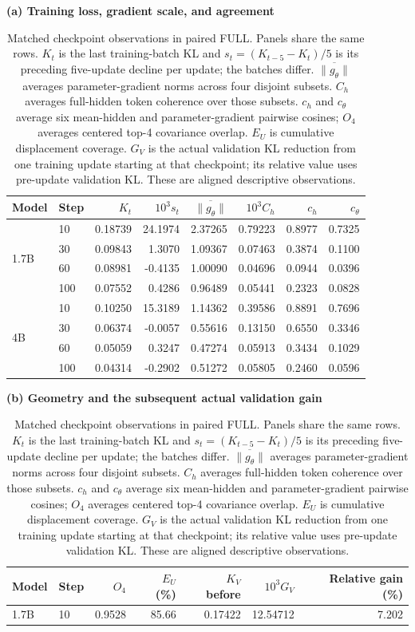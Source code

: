 \begin{table}[!htbp]
\centering
\caption{Matched checkpoint observations in paired FULL. Panels share the same rows. $K_t$ is the last training-batch KL and $s_t=(K_{t-5}-K_t)/5$ is its preceding five-update decline per update; the batches differ. $\overline{\|g_\theta\|}$ averages parameter-gradient norms across four disjoint subsets. $C_h$ averages full-hidden token coherence over those subsets. $c_h$ and $c_\theta$ average six mean-hidden and parameter-gradient pairwise cosines; $O_4$ averages centered top-4 covariance overlap. $E_U$ is cumulative displacement coverage. $G_V$ is the actual validation KL reduction from one training update starting at that checkpoint; its relative value uses pre-update validation KL. These are aligned descriptive observations.}
\label{tab:joint_checkpoint_audit}
\small\setlength{\tabcolsep}{7pt}
\textbf{(a) Training loss, gradient scale, and agreement}\par\smallskip
\begin{tabular}{llrrrrrr}
\toprule
Model & Step & $K_t$ & $10^3s_t$ & $\overline{\|g_\theta\|}$ & $10^3C_h$ & $c_h$ & $c_\theta$ \\
\midrule
\multirow{4}{*}{1.7B} & 10 & 0.18739 & 24.1974 & 2.37265 & 0.79223 & 0.8977 & 0.7325 \\
 & 30 & 0.09843 & 1.3070 & 1.09367 & 0.07463 & 0.3874 & 0.1100 \\
 & 60 & 0.08981 & -0.4135 & 1.00090 & 0.04696 & 0.0944 & 0.0396 \\
 & 100 & 0.07552 & 0.4286 & 0.96489 & 0.05441 & 0.2323 & 0.0828 \\
\midrule
\multirow{4}{*}{4B} & 10 & 0.10250 & 15.3189 & 1.14362 & 0.39586 & 0.8891 & 0.7696 \\
 & 30 & 0.06374 & -0.0057 & 0.55616 & 0.13150 & 0.6550 & 0.3346 \\
 & 60 & 0.05059 & 0.3247 & 0.47274 & 0.05913 & 0.3434 & 0.1029 \\
 & 100 & 0.04314 & -0.2902 & 0.51272 & 0.05805 & 0.2460 & 0.0596 \\
\bottomrule
\end{tabular}
\par\medskip
\textbf{(b) Geometry and the subsequent actual validation gain}\par\smallskip
\begin{tabular}{llrrrrr}
\toprule
Model & Step & $O_4$ & $E_U$ (\%) & $K_V$ before & $10^3G_V$ & Relative gain (\%) \\
\midrule
\multirow{4}{*}{1.7B} & 10 & 0.9528 & 85.66 & 0.17422 & 12.54712 & 7.202 \\

\end{tabular}
\end{table}
